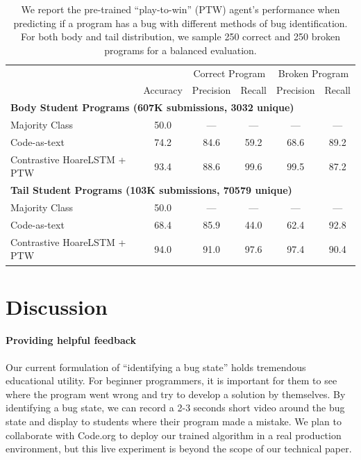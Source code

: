 \documentclass{article}
\newcommand{\EDIT}[1]{#1}%
\begin{document}
\begin{table}[]
\footnotesize
\centering 
\begin{tabular}{@{}lccccc@{}}
\toprule
                                  &      & \multicolumn{2}{c}{Correct Program} & \multicolumn{2}{c}{Broken Program} \\ 
                                  & Accuracy & Precision              & Recall             & Precision             & Recall             \\ \midrule
\multicolumn{6}{l}{\textbf{Body Student Programs (607K submissions, 3032 unique)}}        \\ \midrule
Majority Class & 50.0 & --- & --- & --- & ---  \\
Code-as-text & 74.2 & 84.6 & 59.2 & 68.6 & 89.2 \\
Contrastive HoareLSTM + PTW       &  93.4    &        88.6          &     99.6          &       99.5           &    87.2             \\ 
\midrule 
\multicolumn{6}{l}{\textbf{Tail Student Programs (103K submissions, 70579 unique)}}        \\ \midrule
Majority Class & 50.0 & --- & --- & --- & ---  \\
Code-as-text & 68.4 & 85.9 & 44.0 & 62.4 & 92.8\\
Contrastive HoareLSTM + PTW       &   94.0   &         91.0         &     97.6            &       97.4           &    90.4             \\
\bottomrule
\end{tabular}
\vspace{0.3cm}
\caption{We report the pre-trained ``play-to-win'' (PTW) agent's performance \EDIT{when predicting if a program has a bug} with different methods of bug identification. For both body and tail distribution, we sample 250 correct and 250 broken programs for a balanced evaluation.}
\label{tab:bounce-result}
\end{table}







\section{Discussion}
\vspace{-2mm}





\EDIT{\paragraph{Providing helpful feedback}  Our current formulation of ``identifying a bug state'' holds tremendous educational utility. For beginner programmers, it is important for them to see where the program went wrong and try to develop a solution by themselves. By identifying a bug state, we can record a 2-3 seconds short video around the bug state and display to students where their program made a mistake. We plan to collaborate with Code.org to deploy our trained algorithm in a real production environment, but this live experiment is beyond the scope of our technical paper.}
\end{document}
